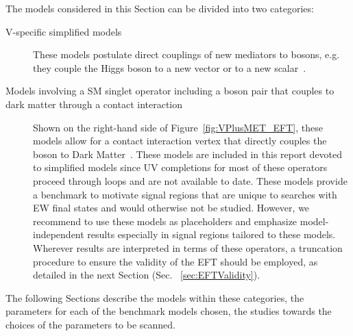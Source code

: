 The models considered in this Section can be divided into two categories:
\begin{description}
	\item[V-specific simplified models] These models postulate direct couplings of new mediators
	to bosons, e.g. they couple the Higgs boson to a new vector or to a new scalar~\cite{Carpenter:2013xra,Berlin:2014cfa}. 
	\item[Models involving a SM singlet operator including a boson pair that couples to dark matter through a contact interaction]
	Shown on the right-hand side of Figure~\ref{fig:VPlusMET_EFT},
	these models allow for a contact interaction vertex that directly couples the boson to Dark Matter~\cite{Cotta:2012nj, Carpenter:2012rg, Crivellin:2015wva,Berlin:2014cfa}.
	These models are included in this report devoted to simplified models since 
	UV completions for most of these operators proceed through loops and are not available to date. 
	These models provide a benchmark to motivate signal regions that are unique to searches with
	EW final states and would otherwise not be studied. However, we recommend to use these models
	as placeholders and emphasize model-independent results especially in signal regions tailored to these models. 
	Wherever results are interpreted in terms of these operators, a truncation procedure
	to ensure the validity of the EFT should be employed, as detailed in the next Section (Sec. ~\ref{sec:EFTValidity}). 
\end{description}


The following Sections describe the models within these categories,
the parameters for each of the benchmark models chosen,
the studies towards the choices of the parameters to be scanned.

